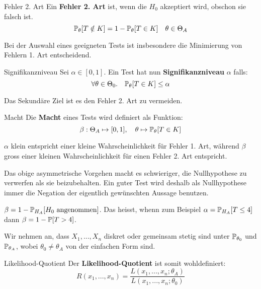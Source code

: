 \begin{subbox}{Fehler 2. Art}
    Ein \textbf{Fehler 2. Art} ist, wenn die $H_0$ akzeptiert wird, obschon sie falsch ist.
    $$\mathbb{P}_\theta[T \notin K] = 1 - \mathbb{P}_\theta [T \in K] \quad \theta \in \Theta_A$$

\end{subbox}



Bei der Auswahl eines geeigneten Tests ist insbesondere die Minimierung von Fehlern 1. Art entscheidend. \smallskip

\begin{mainbox}{Signifikanzniveau}
    Sei $\alpha \in [0,1]$. Ein Test hat nun \textbf{Signifikanzniveau} $\alpha$ falls:
    $$\forall \theta \in \Theta_0. \quad \mathbb{P}_\theta[T \in K] \leq \alpha$$
\end{mainbox}

Das Sekundäre Ziel ist es den Fehler 2. Art zu vermeiden. \smallskip

\begin{mainbox}{Macht}
    Die \textbf{Macht} eines Tests wird definiert als Funktion:
    $$\beta: \Theta_A \mapsto [0,1], \quad \theta \mapsto \mathbb{P}_\theta[T \in K]$$
\end{mainbox}

\Bem $\alpha$ klein entspricht einer kleine Wahrscheinlichkeit für Fehler 1. Art, während $\beta$ gross einer kleinen Wahrscheinlichkeit für einen Fehler 2. Art entspricht. \smallskip

Das obige asymmetrische Vorgehen macht es schwieriger, die Nullhypothese zu verwerfen als sie beizubehalten. Ein guter Test wird deshalb als Nullhypothese immer die Negation der eigentlich gewünschten Aussage benutzen.

\Bem $\beta = 1 - \mathbb{P}_{H_A}[H_0 \text{ angenommen}]$. Das heisst, whenn zum Beispiel $\alpha = \mathbb{P}_{H_A}[T \leq 4]$ dann $\beta = 1 - \mathbb{P}[T > 4]$.





Wir nehmen an, dass $X_1,...,X_n$ diskret oder gemeinsam stetig sind unter $\mathbb{P}_{\theta_0}$ und $\mathbb{P}_{\theta_A}$, wobei $\theta_0 \neq \theta_A$ von der einfachen Form sind. \smallskip

\begin{subbox}{Likelihood-Quotient}
Der \textbf{Likelihood-Quotient} ist somit wohldefiniert:
$$R(x_1,...,x_n) = \frac{L(x_1,...,x_n; \theta_A)}{L(x_1,...,x_n; \theta_0)}$$
\end{subbox}

